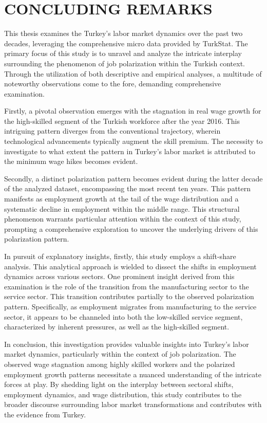 \section{CONCLUDING REMARKS}

\begin{onehalfspace}
This thesis examines the Turkey's labor market dynamics over the past
two decades, leveraging the comprehensive micro data provided by TurkStat.
The primary focus of this study is to unravel and analyze the intricate
interplay surrounding the phenomenon of job polarization within the
Turkish context. Through the utilization of both descriptive and empirical
analyses, a multitude of noteworthy observations come to the fore,
demanding comprehensive examination.

Firstly, a pivotal observation emerges with the stagnation in real
wage growth for the high-skilled segment of the Turkish workforce
after the year 2016. This intriguing pattern diverges from the conventional
trajectory, wherein technological advancements typically augment the
skill premium. The necessity to investigate to what extent the pattern
in Turkey's labor market is attributed to the minimum wage hikes becomes
evident.

Secondly, a distinct polarization pattern becomes evident during the
latter decade of the analyzed dataset, encompassing the most recent
ten years. This pattern manifests as employment growth at the tail
of the wage distribution and a systematic decline in employment within
the middle range. This structural phenomenon warrants particular attention
within the context of this study, prompting a comprehensive exploration
to uncover the underlying drivers of this polarization pattern.

In pursuit of explanatory insights, firstly, this study employs a
shift-share analysis. This analytical approach is wielded to dissect
the shifts in employment dynamics across various sectors. One prominent
insight derived from this examination is the role of the transition
from the manufacturing sector to the service sector. This transition
contributes partially to the observed polarization pattern. Specifically,
as employment migrates from manufacturing to the service sector, it
appears to be channeled into both the low-skilled service segment,
characterized by inherent pressures, as well as the high-skilled segment. 

In conclusion, this investigation provides valuable insights into
Turkey's labor market dynamics, particularly within the context of
job polarization. The observed wage stagnation among highly skilled
workers and the polarized employment growth patterns necessitate a
nuanced understanding of the intricate forces at play. By shedding
light on the interplay between sectoral shifts, employment dynamics,
and wage distribution, this study contributes to the broader discourse
surrounding labor market transformations and contributes with the
evidence from Turkey.
\end{onehalfspace}
\begin{center}
\pagebreak
\par\end{center}

